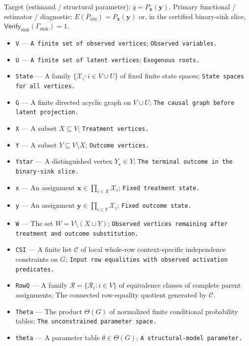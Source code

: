\documentclass{article}
\begin{document}
Target (estimand / structural parameter): \(q=P_{\mathbf x}(\mathbf y)\).
Primary functional / estimator / diagnostic: \(E(P_{\mathrm{obs}})=P_{\mathbf x}(\mathbf y)\) or, in the certified binary-sink slice, \(\mathsf{Verify}_{\mathrm{sink}}(\Gamma_{\mathrm{sink}})=1\).
\begin{itemize}
  \item \texttt{V} --- \texttt{A finite set of observed vertices}; \texttt{Observed variables.}
  \item \texttt{U} --- \texttt{A finite set of latent vertices}; \texttt{Exogenous roots.}
  \item \texttt{State} --- A family \(\{\mathcal X_i:i\in V\cup U\}\) of fixed finite state spaces; \texttt{State spaces for all vertices.}
  \item \texttt{G} --- A finite directed acyclic graph on \(V\cup U\); \texttt{The causal graph before latent projection.}
  \item \texttt{X} --- A subset \(X\subseteq V\); \texttt{Treatment vertices.}
  \item \texttt{Y} --- A subset \(Y\subseteq V\setminus X\); \texttt{Outcome vertices.}
  \item \texttt{Ystar} --- A distinguished vertex \(Y_{\star}\in Y\); \texttt{The terminal outcome in the binary-\allowbreak{}sink slice.}
  \item \texttt{x} --- An assignment \(\mathbf x\in\prod_{i\in X}\mathcal X_i\); \texttt{Fixed treatment state.}
  \item \texttt{y} --- An assignment \(\mathbf y\in\prod_{i\in Y}\mathcal X_i\); \texttt{Fixed outcome state.}
  \item \texttt{W} --- The set \(W=V\setminus(X\cup Y)\); \texttt{Observed vertices remaining after treatment and outcome substitution.}
  \item \texttt{CSI} --- A finite list \(\mathcal C\) of local whole-row context-specific independence constraints on \(G\); \texttt{Input row equalities with observed activation predicates.}
  \item \texttt{RowQ} --- A family \(\mathcal R=\{\mathcal R_i:i\in V\}\) of equivalence classes of complete parent assignments; The connected row-equality quotient generated by \(\mathcal C\).
  \item \texttt{Theta} --- The product \(\Theta(G)\) of normalized finite conditional probability tables; \texttt{The unconstrained parameter space.}
  \item \texttt{theta} --- A parameter table \(\theta\in\Theta(G)\); \texttt{A structural-\allowbreak{}model parameter.}

\end{itemize}
\end{document}
